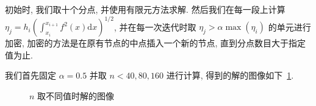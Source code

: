 \documentclass[UTF8]{article}
\begin{document}
    初始时, 我们取十个分点, 并使用有限元方法求解.
    然后我们在每一段上计算 $\eta_j=h_i\left( \int_{x_i}^{x_{i+1}} f^2(x)\textrm{d}x \right)^{1/2}$, 并在每一次迭代时取 $\eta_j>\alpha \max(\eta_i)$ 的单元进行加密, 加密的方法是在原有节点的中点插入一个新的节点, 直到分点数目大于指定值为止.

    我们首先固定 $\alpha=0.5$ 并取 $n<40,80,160$ 进行计算, 得到的解的图像如下~\ref{fig:figure3}.

    \begin{figure}[h]
        \centering
        \caption{$n$ 取不同值时解的图像}
        \label{fig:figure3}
    \end{figure}
\end{document}
